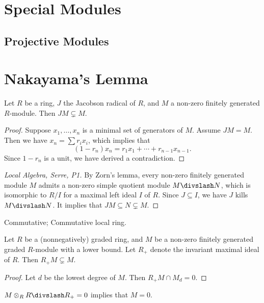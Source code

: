\section{Special Modules}

\subsection{Projective Modules}

\section{Nakayama's Lemma}

\begin{lemma}
  Let $R$ be a ring, $J$ the Jacobson radical of $R$, and $M$ a non-zero finitely generated $R$-module. Then $JM\subsetneq M$.
\end{lemma}

\begin{proof}
  Suppose $x_1, \dotsc, x_n$ is a minimal set of generators of $M$. Assume $JM=M$. Then we have $x_n=\sum r_ix_i$, which implies that
  \begin{equation*}
    (1-r_n)x_n=r_1x_1+\dotsb+r_{n-1}x_{n-1}.
  \end{equation*}
  Since $1-r_n$ is a unit, we have derived a contradiction.
\end{proof}

\begin{proof}[Local Algebra, Serre, P1]
  By Zorn's lemma, every non-zero finitely generated module $M$ admits a non-zero simple quotient module $M\DIV N$, which is isomorphic to $R/I$ for a maximal left ideal $I$ of $R$. Since $J\subseteq I$, we have $J$ kills $M\DIV N$. It implies that $JM\subseteq N\subsetneq M$.
\end{proof}

\begin{corollary}
  Commutative; Commutative local ring.
\end{corollary}

\begin{lemma}
  Let $R$ be a (nonnegatively) graded ring, and $M$ be a non-zero finitely generated graded $R$-module with a lower bound. Let $R_+$ denote the invariant maximal ideal of $R$. Then $R_+M\subsetneq M$.
\end{lemma}

\begin{proof}
  Let $d$ be the lowest degree of $M$. Then $R_+M\cap M_d=0$.
\end{proof}

\begin{corollary}
  $M\otimes_R R\DIV R_+=0$ implies that $M=0$.
\end{corollary}
